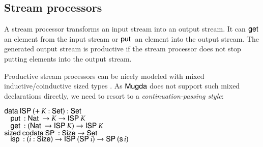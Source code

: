 \subsection{Stream processors}

A stream processor \cite{journals/entcs/GhaniHP06} transforms an input stream into an output stream.
It can $\mathsf{get}\:$ an element from the input stream or $\mathsf{put}\:$ an element into the output stream.
The generated output stream is productive if the stream processor does not stop putting elements into the output stream.

Productive stream processors can be nicely modeled with mixed in\-ductive/coinductive sized types \cite{abel:aplas07}. 
As $\textsf{Mugda}$ does not support such mixed declarations directly, we need to resort to a \emph{continuation-passing style}:
\begin{bsp}
$\mathsf{data}\: \mathsf{ISP}\: ( + \: K : \mathsf{Set}) : \mathsf{Set}$\\
$\hspace*{3mm} \mathsf{put}\: : \mathsf{Nat}\: \rightarrow K \rightarrow \mathsf{ISP}\: K$ \\
$\hspace*{3mm} \mathsf{get}\: : (\mathsf{Nat}\: \rightarrow \mathsf{ISP}\: K) \rightarrow \mathsf{ISP}\: K $ \\

$\mathsf{sized}\: \mathsf{codata}\: \mathsf{SP}\: : \mathsf{Size} \rightarrow \mathsf{Set}$\\
$\hspace*{3mm} \mathsf{isp}\: : (i : \mathsf{Size}) \rightarrow \mathsf{ISP}\: (\mathsf{SP}\: i) \rightarrow \mathsf{SP}\: (\mathsf{s}\, i)$
\end{bsp}

